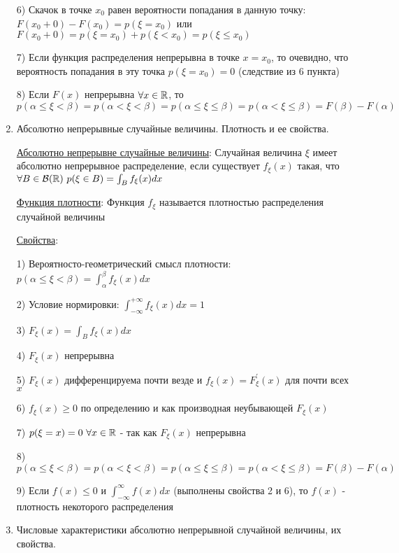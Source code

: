 \documentclass[12pt]{article}
\begin{document}
\begin{enumerate}
    6) Скачок в точке $x_0$ равен вероятности попадания в данную точку: $F(x_0 + 0) - F(x_0) = p(\xi = x_0)$ или $F(x_0 + 0) = p(\xi = x_0) + p(\xi < x_0) = p(\xi \leq x_0)$

    7) Если функция распределения непрерывна в точке $x = x_0$, то очевидно, что вероятность попадания в эту точка $p(\xi = x_0) = 0$ (следствие из 6 пункта)
    
    8) Если $F(x)$ непрерывна $\forall x \in \mathbb{R}$, то $p(\alpha \leq \xi < \beta) = p(\alpha < \xi < \beta) = p(\alpha \leq \xi \leq \beta) = p(\alpha < \xi \leq \beta) = F(\beta) - F(\alpha)$
    
    \item Абсолютно непрерывные случайные величины. Плотность и ее свойства.

    \hyperlink{continuousdistributionproperties}{Абсолютно непрерывне случайные величины}: Случайная величина $\xi$ имеет абсолютно непрерывное распределение, если существует $f_\xi(x)$ такая, что $\forall B \in \mathcal{B}(\mathbb{R})
    \ p(\xi \in B) = \int_B f_\xi(x)dx$

    \hyperlink{densityfunctiondefinition}{Функция плотности}: Функция $f_\xi$ называется плотностью распределения случайной величины

    \hyperlink{densityfunctionproperties}{Свойства}:

    1) Вероятносто-геометрический смысл плотности: $p(\alpha \leq \xi < \beta) = \int_{\alpha}^\beta f_\xi(x) dx$

    2) Условие нормировки: $\int_{-\infty}^{+\infty} f_\xi(x)dx = 1$

    3) $F_\xi(x) = \int_B f_\xi(x)dx$

    4) $F_\xi(x)$ непрерывна 

    5) $F_\xi(x)$ дифференцируема почти везде и $f_\xi(x) = F^\prime_\xi(x)$ для почти всех $x$

    6) $f_\xi(x) \geq 0$ по определению и как производная неубывающей $F_\xi(x)$

    7) $p(\xi = x) = 0 \ \forall x \in \mathbb{R}$ - так как $F_\xi(x)$ непрерывна

    8) $p(\alpha \leq \xi < \beta) = p(\alpha < \xi < \beta) = p(\alpha \leq \xi \leq \beta) = p(\alpha < \xi \leq \beta) = F(\beta) - F(\alpha)$

    9) \Ths Если $f(x) \leq 0$ и $\int_{-\infty}^{\infty} f(x)dx$ (выполнены свойства 2 и 6), то $f(x)$ - плотность некоторого распределения

    \item Числовые характеристики абсолютно непрерывной случайной величины, их свойства.


\end{enumerate}
\end{document}
